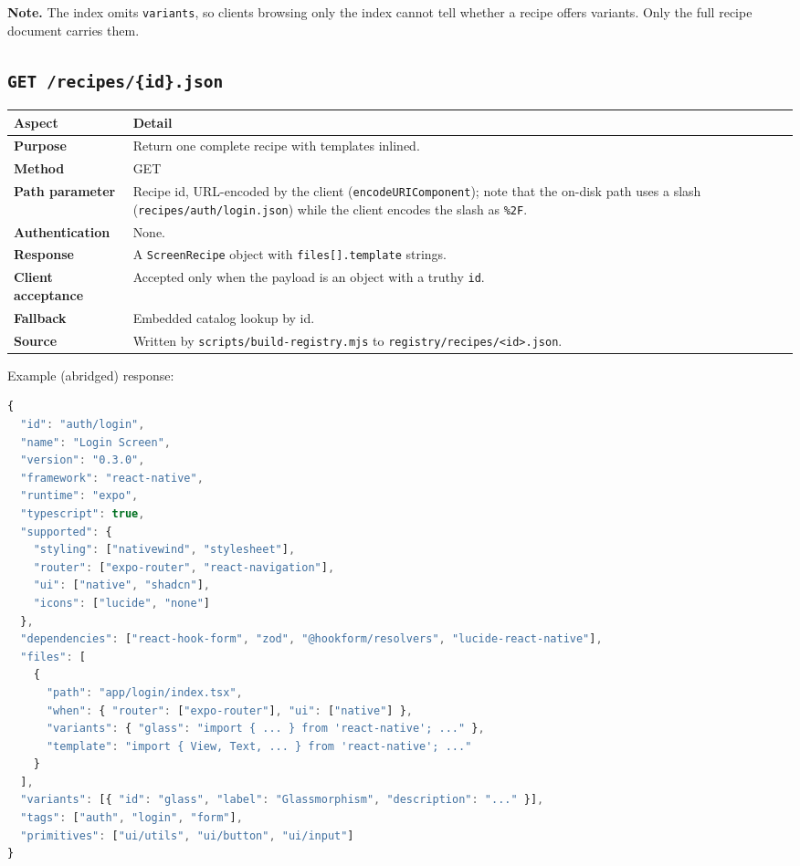 \textbf{Note.} The index omits \texttt{variants}, so clients browsing only the
index cannot tell whether a recipe offers variants. Only the full recipe document
carries them.

\subsection*{\texttt{GET /recipes/\{id\}.json}}

\begin{longtable}{@{}L{3.4cm}L{10.8cm}@{}}
\toprule
\textbf{Aspect} & \textbf{Detail} \\
\midrule
\textbf{Purpose} & Return one complete recipe with templates inlined. \\
\textbf{Method} & GET \\
\textbf{Path parameter} & Recipe id, URL-encoded by the client
(\texttt{encodeURIComponent}); note that the on-disk path uses a slash
(\texttt{recipes/auth/login.json}) while the client encodes the slash as
\texttt{\%2F}. \\
\textbf{Authentication} & None. \\
\textbf{Response} & A \texttt{ScreenRecipe} object with \texttt{files[].template}
strings. \\
\textbf{Client acceptance} & Accepted only when the payload is an object with a
truthy \texttt{id}. \\
\textbf{Fallback} & Embedded catalog lookup by id. \\
\textbf{Source} & Written by \texttt{scripts/build-registry.mjs} to
\texttt{registry/recipes/<id>.json}. \\
\bottomrule
\end{longtable}

Example (abridged) response:

\begin{lstlisting}[language=JavaScript]
{
  "id": "auth/login",
  "name": "Login Screen",
  "version": "0.3.0",
  "framework": "react-native",
  "runtime": "expo",
  "typescript": true,
  "supported": {
    "styling": ["nativewind", "stylesheet"],
    "router": ["expo-router", "react-navigation"],
    "ui": ["native", "shadcn"],
    "icons": ["lucide", "none"]
  },
  "dependencies": ["react-hook-form", "zod", "@hookform/resolvers", "lucide-react-native"],
  "files": [
    {
      "path": "app/login/index.tsx",
      "when": { "router": ["expo-router"], "ui": ["native"] },
      "variants": { "glass": "import { ... } from 'react-native'; ..." },
      "template": "import { View, Text, ... } from 'react-native'; ..."
    }
  ],
  "variants": [{ "id": "glass", "label": "Glassmorphism", "description": "..." }],
  "tags": ["auth", "login", "form"],
  "primitives": ["ui/utils", "ui/button", "ui/input"]
}
\end{lstlisting}


